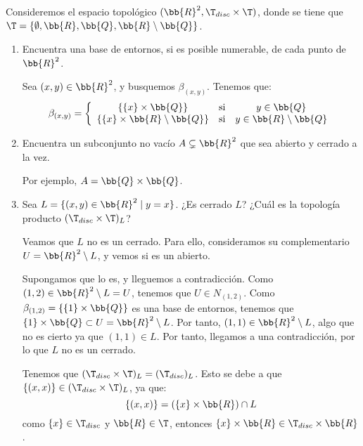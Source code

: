 \begin{ejercicio}
    Consideremos el espacio topológico $(\bb{R}^2, \T_{disc} \times \T )$, donde se tiene que $\T = \{\emptyset, \bb{R}, \bb{Q}, \bb{R}\setminus \bb{Q}\}$.
    \begin{enumerate}
        \item Encuentra una base de entornos, si es posible numerable, de cada punto de $\bb{R}^2$.

        Sea $(x,y)\in \bb{R}^2$, y busquemos $\beta_{(x,y)}$. Tenemos que:
        \begin{equation*}
            \beta_{(x,y)} = 
            \left\{
            \begin{array}{ccc}
                \{\{x\}\times \bb{Q}\} & \text{si} & y\in \bb{Q} \\
                \{\{x\}\times \bb{R}\setminus\bb{Q}\} & \text{si} & y\in \bb{R}\setminus\bb{Q} 
            \end{array}
            \right.
        \end{equation*}
        
        \item Encuentra un subconjunto no vacío $A \subsetneq \bb{R}^2$ que sea abierto y cerrado a la vez.

        Por ejemplo, $A=\bb{Q}\times \bb{Q}$.
        
        \item Sea $L = \{(x, y) \in \bb{R}^2\mid y = x\}$. ¿Es cerrado $L$? ¿Cuál es la topología producto $(\T_{disc} \times \T )_L$?

        Veamos que $L$ no es un cerrado. Para ello, consideramos su complementario $U=\bb{R}^2\setminus L$, y vemos si es un abierto.

        Supongamos que lo es, y lleguemos a contradicción. Como $(1,2)\in \bb{R}^2\setminus L=U$, tenemos que $U\in N_{(1,2)}$. Como $\beta_{(1,2)}=\{\{1\}\times \bb{Q}\}$ es una base de entornos, tenemos que $\{1\}\times \bb{Q}\subset U=\bb{R}^2\setminus L$. Por tanto, $(1,1)\in \bb{R}^2\setminus L$, algo que no es cierto ya que $(1,1)\in L$. Por tanto, llegamos a una contradicción, por lo que $L$ no es un cerrado.

        

        Tenemos que $(\T_{disc}\times \T)_L = (\T_{disc})_L$. Esto se debe a que $\{(x,x)\}\in (\T_{disc}\times \T)_L$, ya que:
        \begin{equation*}
            \{(x,x)\}=(\{x\}\times \bb{R})\cap L
        \end{equation*}
        como $\{x\}\in \T_{disc}$ y $\bb{R}\in \T$, entonces $\{x\}\times \bb{R}\in \T_{disc}\times \bb{R}$.
    \end{enumerate}
\end{ejercicio}


